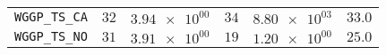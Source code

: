 \begin{table}[H]
\begin{tabularx}{\textwidth}{l||CC|CC||c}
		\texttt{WGGP\_TS\_CA} & $ 32$ & $ \num{3.94e+00}$ & $ 34$ & $ \num{8.80e+03}$ &$ 33.0$  \\
		\texttt{WGGP\_TS\_NO} & $ 31$ & $ \num{3.91e+00}$ & $ 19$ & $ \num{1.20e+00}$ &$ 25.0$  \\
	\end{tabularx}
\end{table}
